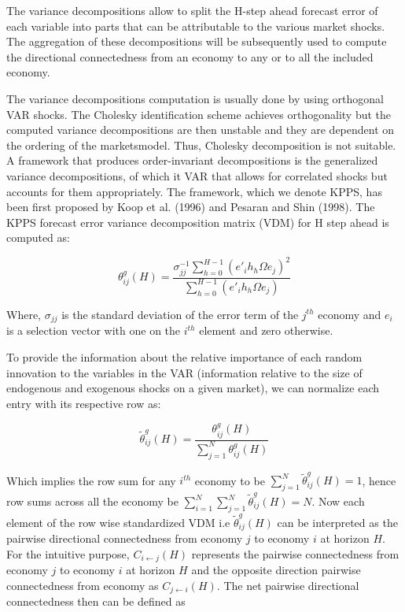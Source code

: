 \documentclass[]{elsarticle} %
\begin{document}
The variance decompositions allow to split the H-step ahead forecast
error of each variable into parts that can be attributable to the
various market shocks. The aggregation of these decompositions will be
subsequently used to compute the directional connectedness from an
economy to any or to all the included economy.

The variance decompositions computation is usually done by using
orthogonal VAR shocks. The Cholesky identification scheme achieves
orthogonality but the computed variance decompositions are then unstable
and they are dependent on the ordering of the marketsmodel. Thus,
Cholesky decomposition is not suitable. A framework that produces
order-invariant decompositions is the generalized variance
decompositions, of which it VAR that allows for correlated shocks but
accounts for them appropriately. The framework, which we denote KPPS,
has been first proposed by Koop et al. (1996) and Pesaran and Shin
(1998). The KPPS forecast error variance decomposition matrix (VDM) for
H step ahead is computed as:

\[\theta _{ij}^{g}\left( H \right)=\frac{\sigma _{jj}^{-1}\sum\nolimits_{h=0}^{H-1}{{{\left( {{{{e}'}}_{i}}{{h}_{h}}\Omega {{e}_{j}} \right)}^{2}}}}{\sum\nolimits_{h=0}^{H-1}{\left( {{{{e}'}}_{i}}{{h}_{h}}\Omega {{e}_{j}} \right)}}\]

Where, \({{\sigma }_{jj}}\) is the standard deviation of the error term
of the \({{j}^{th}}\) economy and \({{e}_{i}}\) is a selection vector
with one on the \({{i}^{th}}\) element and zero otherwise.

To provide the information about the relative importance of each random
innovation to the variables in the VAR (information relative to the size
of endogenous and exogenous shocks on a given market), we can normalize
each entry with its respective row as:

\[\tilde{\theta }_{ij}^{g}\left( H \right)=\frac{\theta _{ij}^{g}\left( H \right)}{\sum\nolimits_{j=1}^{N}{\theta _{ij}^{g}\left( H \right)}}\]

Which implies the row sum for any \({{i}^{th}}\) economy to be
\(\sum\nolimits_{j=1}^{N}{\tilde{\theta }_{ij}^{g}\left( H \right)}=1\),
hence row sums across all the economy be
\(\sum\nolimits_{i=1}^{N}{\sum\nolimits_{j=1}^{N}{\tilde{\theta }_{ij}^{g}\left( H \right)}}=N\).
Now each element of the row wise standardized VDM i.e
\({\tilde \theta _{ij}^g\left( H \right)}\) can be interpreted as the
pairwise directional connectedness from economy \(j\) to economy \(i\)
at horizon \(H\). For the intuitive purpose,
\({{C}_{i\leftarrow j}}\left( H \right)\) represents the pairwise
connectedness from economy \(j\) to economy \(i\) at horizon \(H\) and
the opposite direction pairwise connectedness from economy as
\({{C}_{j\leftarrow i}}\left( H \right)\). The net pairwise directional
connectedness then can be defined as
\end{document}
